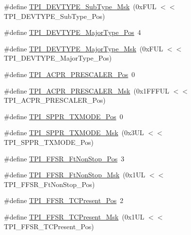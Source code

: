 \begin{DoxyCompactItemize}
\item 
\#define \mbox{\hyperlink{group___c_m_s_i_s___t_p_i_ga5b2fd7dddaf5f64855d9c0696acd65c1}{T\+P\+I\+\_\+\+D\+E\+V\+T\+Y\+P\+E\+\_\+\+Sub\+Type\+\_\+\+Msk}}~(0x\+F\+U\+L $<$$<$ T\+P\+I\+\_\+\+D\+E\+V\+T\+Y\+P\+E\+\_\+\+Sub\+Type\+\_\+\+Pos)
\item 
\#define \mbox{\hyperlink{group___c_m_s_i_s___t_p_i_ga69c4892d332755a9f64c1680497cebdd}{T\+P\+I\+\_\+\+D\+E\+V\+T\+Y\+P\+E\+\_\+\+Major\+Type\+\_\+\+Pos}}~4
\item 
\#define \mbox{\hyperlink{group___c_m_s_i_s___t_p_i_gaecbceed6d08ec586403b37ad47b38c88}{T\+P\+I\+\_\+\+D\+E\+V\+T\+Y\+P\+E\+\_\+\+Major\+Type\+\_\+\+Msk}}~(0x\+F\+U\+L $<$$<$ T\+P\+I\+\_\+\+D\+E\+V\+T\+Y\+P\+E\+\_\+\+Major\+Type\+\_\+\+Pos)
\item 
\#define \mbox{\hyperlink{group___c_m_s_i_s___t_p_i_ga5a82d274eb2df8b0c92dd4ed63535928}{T\+P\+I\+\_\+\+A\+C\+P\+R\+\_\+\+P\+R\+E\+S\+C\+A\+L\+E\+R\+\_\+\+Pos}}~0
\item 
\#define \mbox{\hyperlink{group___c_m_s_i_s___t_p_i_ga4fcacd27208419929921aec8457a8c13}{T\+P\+I\+\_\+\+A\+C\+P\+R\+\_\+\+P\+R\+E\+S\+C\+A\+L\+E\+R\+\_\+\+Msk}}~(0x1\+F\+F\+F\+U\+L $<$$<$ T\+P\+I\+\_\+\+A\+C\+P\+R\+\_\+\+P\+R\+E\+S\+C\+A\+L\+E\+R\+\_\+\+Pos)
\item 
\#define \mbox{\hyperlink{group___c_m_s_i_s___t_p_i_ga0f302797b94bb2da24052082ab630858}{T\+P\+I\+\_\+\+S\+P\+P\+R\+\_\+\+T\+X\+M\+O\+D\+E\+\_\+\+Pos}}~0
\item 
\#define \mbox{\hyperlink{group___c_m_s_i_s___t_p_i_gaca085c8a954393d70dbd7240bb02cc1f}{T\+P\+I\+\_\+\+S\+P\+P\+R\+\_\+\+T\+X\+M\+O\+D\+E\+\_\+\+Msk}}~(0x3\+U\+L $<$$<$ T\+P\+I\+\_\+\+S\+P\+P\+R\+\_\+\+T\+X\+M\+O\+D\+E\+\_\+\+Pos)
\item 
\#define \mbox{\hyperlink{group___c_m_s_i_s___t_p_i_ga9537b8a660cc8803f57cbbee320b2fc8}{T\+P\+I\+\_\+\+F\+F\+S\+R\+\_\+\+Ft\+Non\+Stop\+\_\+\+Pos}}~3
\item 
\#define \mbox{\hyperlink{group___c_m_s_i_s___t_p_i_gaaa313f980974a8cfc7dac68c4d805ab1}{T\+P\+I\+\_\+\+F\+F\+S\+R\+\_\+\+Ft\+Non\+Stop\+\_\+\+Msk}}~(0x1\+U\+L $<$$<$ T\+P\+I\+\_\+\+F\+F\+S\+R\+\_\+\+Ft\+Non\+Stop\+\_\+\+Pos)
\item 
\#define \mbox{\hyperlink{group___c_m_s_i_s___t_p_i_gad30fde0c058da2ffb2b0a213be7a1b5c}{T\+P\+I\+\_\+\+F\+F\+S\+R\+\_\+\+T\+C\+Present\+\_\+\+Pos}}~2
\item 
\#define \mbox{\hyperlink{group___c_m_s_i_s___t_p_i_ga0d6bfd263ff2fdec72d6ec9415fb1135}{T\+P\+I\+\_\+\+F\+F\+S\+R\+\_\+\+T\+C\+Present\+\_\+\+Msk}}~(0x1\+U\+L $<$$<$ T\+P\+I\+\_\+\+F\+F\+S\+R\+\_\+\+T\+C\+Present\+\_\+\+Pos)

\end{DoxyCompactItemize}
